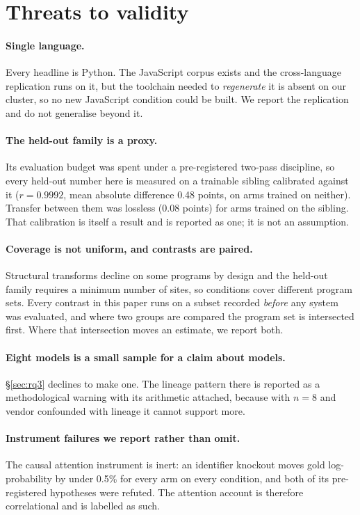 \documentclass[sigconf,review,anonymous]{acmart}
\begin{document}
\section{Threats to validity}
\paragraph{Single language.} Every headline is Python. The JavaScript corpus exists and the
cross-language replication runs on it, but the toolchain needed to \emph{regenerate} it is absent
on our cluster, so no new JavaScript condition could be built. We report the replication and do not
generalise beyond it.

\paragraph{The held-out family is a proxy.} Its evaluation budget was spent under a pre-registered
two-pass discipline, so every held-out number here is measured on a trainable sibling calibrated
against it ($r = 0.9992$, mean absolute difference 0.48 points, on arms trained on neither).
Transfer between them was lossless (0.08 points) for arms trained on the sibling. That calibration
is itself a result and is reported as one; it is not an assumption.

\paragraph{Coverage is not uniform, and contrasts are paired.} Structural transforms decline on
some programs by design and the held-out family requires a minimum number of sites, so conditions
cover different program sets. Every contrast in this paper runs on a subset recorded \emph{before}
any system was evaluated, and where two groups are compared the program set is intersected first.
Where that intersection moves an estimate, we report both.

\paragraph{Eight models is a small sample for a claim about models.} \S\ref{sec:rq3} declines to
make one. The lineage pattern there is reported as a methodological warning with its arithmetic
attached, because with $n=8$ and vendor confounded with lineage it cannot support more.

\paragraph{Instrument failures we report rather than omit.} The causal attention instrument is
inert: an identifier knockout moves gold log-probability by under 0.5\% for every arm on every
condition, and both of its pre-registered hypotheses were refuted. The attention account is
therefore correlational and is labelled as such.
\end{document}
